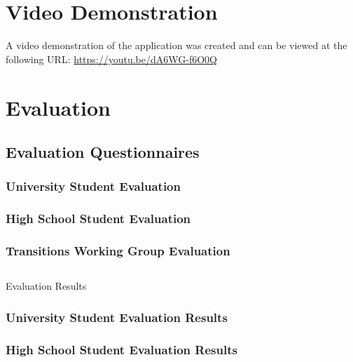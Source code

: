 \documentclass{l4proj}
\begin{document}
\begin{appendices}
\chapter{Video Demonstration} \label{app:video}
A video demonstration of the application was created and can be viewed at the following URL:
\newline
\url{https://youtu.be/dA6WG-f6O0Q}

\chapter{Evaluation} \label{app:eval}
\section{Evaluation Questionnaires} \label{app:evalSurvey}
\subsection{University Student Evaluation} \label{app:evalUni}


\subsection{High School Student Evaluation} \label{app:evalHigh}


\subsection{Transitions Working Group Evaluation} \label{app:evalTwg}


\section{}{Evaluation Results} \label{app:evalResults}
\subsection{University Student Evaluation Results} \label{app:evalUniResults}

 
\subsection{High School Student Evaluation Results} \label{app:evalHighResults}



\end{appendices}
\end{document}

